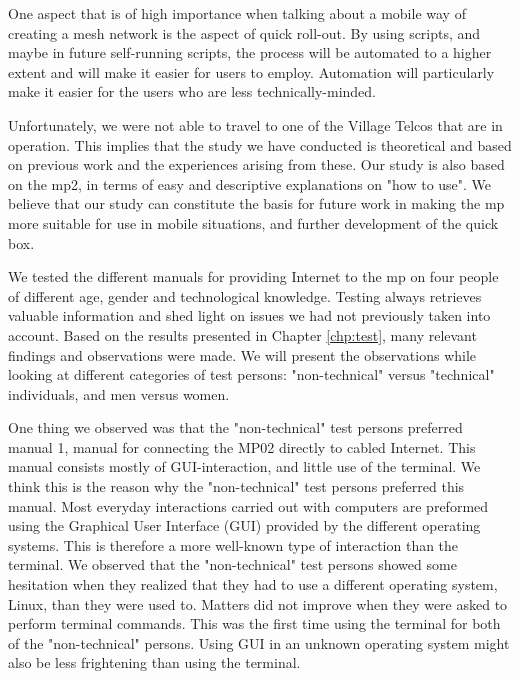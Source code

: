 One aspect that is of high importance when talking about a mobile way of creating a mesh network is the aspect of quick roll-out. By using scripts, and maybe in future self-running scripts, the process will be automated to a higher extent and will make it easier for users to employ. Automation will particularly make it easier for the users who are less technically-minded. 

Unfortunately, we were not able to travel to one of the Village Telcos that are in operation. This implies that the study we have conducted is theoretical and based on previous work and the experiences arising from these. Our study is also based on the \gls{mp2}, in terms of easy and descriptive explanations on "how to use". We believe that our study can constitute the basis for future work in making the \gls{mp} more suitable for use in mobile situations, and further development of the \gls{quick} box. 

We tested the different manuals for providing Internet to the \gls{mp} on four people of different age, gender and technological knowledge. Testing always retrieves valuable information and shed light on issues we had not previously taken into account. Based on the results presented in Chapter \ref{chp:test}, many relevant findings and observations were made. We will present the observations while looking at different categories of test persons: "non-technical" versus "technical" individuals, and men versus women. 

One thing we observed was that the "non-technical" test persons preferred manual 1, manual for connecting the MP02 directly to cabled Internet. This manual consists mostly of GUI-interaction, and little use of the terminal. We think this is the reason why the "non-technical" test persons preferred this manual. Most everyday interactions carried out with computers are preformed using the Graphical User Interface (GUI) provided by the different operating systems.  This is therefore a more well-known type of interaction than the terminal. We observed that the "non-technical" test persons showed some hesitation when they realized that they had to use a different operating system, Linux, than they were used to. Matters did not improve when they were asked to perform terminal commands. This was the first time using the terminal for both of the "non-technical" persons. Using GUI in an unknown operating system might also be less frightening than using the terminal. 

